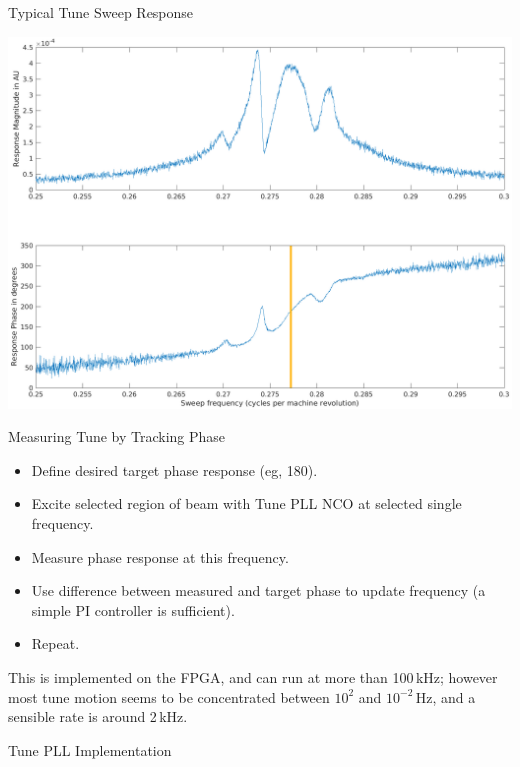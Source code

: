 \documentclass[xcolor=table]{beamer}
\begin{document}
%
\begin{frame}{Typical Tune Sweep Response}

\includegraphics[width=\linewidth]{tune-sweep-complex.png}

\end{frame}


%
\begin{frame}{Measuring Tune by Tracking Phase}

\begin{itemize}
\item Define desired target phase response (eg, 180\textdegree).
\item Excite selected region of beam with Tune PLL NCO at selected single
    frequency.
\item Measure phase response at this frequency.
\item Use difference between measured and target phase to update frequency (a
    simple PI controller is sufficient).
\item Repeat.
\end{itemize}

This is implemented on the FPGA, and can run at more than 100\,kHz; however most
tune motion seems to be concentrated between $10^2$ and $10^{-2}$\,Hz, and a
sensible rate is around 2\,kHz.

\end{frame}


%
\begin{frame}{Tune PLL Implementation}



\end{frame}
\end{document}
